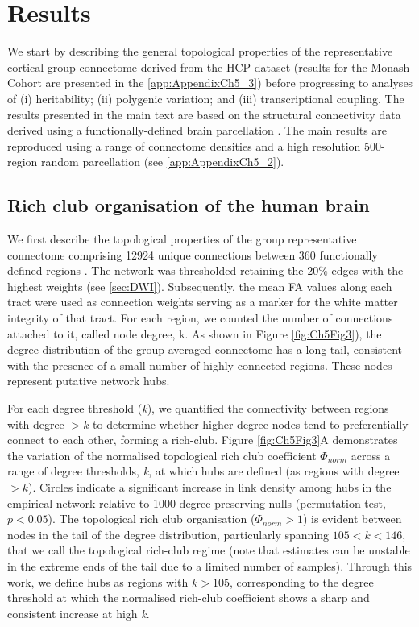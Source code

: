 \section{Results}

We start by describing the general topological properties of the representative cortical group connectome derived from the HCP dataset (results for the Monash Cohort are presented in the \ref{app:AppendixCh5_3}) before progressing to analyses of (i) heritability; (ii) polygenic variation; and (iii) transcriptional coupling. The results presented in the main text are based on the structural connectivity data derived using a functionally-defined brain parcellation \citep{Glasser2016}. The main results are reproduced using a range of connectome densities and a high resolution 500-region random parcellation (see \ref{app:AppendixCh5_2}). 

\subsection{Rich club organisation of the human brain}

We first describe the topological properties of the group representative connectome comprising \num{12924} unique connections between 360 functionally defined regions \citep{Glasser2016}. The network was thresholded retaining the $20\%$ edges with the highest weights (see \ref{sec:DWI}). Subsequently, the mean FA values along each tract were used as connection weights serving as a marker for the white matter integrity of that tract. For each region, we counted the number of connections attached to it, called node degree, k. As shown in Figure \ref{fig:Ch5Fig3}), the degree distribution of the group-averaged connectome has a long-tail, consistent with the presence of a small number of highly connected regions. These nodes represent putative network hubs. 

For each degree threshold (\textit{k}), we quantified the connectivity between regions with degree $> k$ to determine whether higher degree nodes tend to preferentially connect to each other, forming a rich-club. Figure \ref{fig:Ch5Fig3}A demonstrates the variation of the normalised topological rich club coefficient $\Phi_{norm}$ across a range of degree thresholds, \textit{k}, at which hubs are defined (as regions with degree $> k$). Circles indicate a significant increase in link density among hubs in the empirical network relative to 1000 degree-preserving nulls (permutation test, $p < 0.05$). The topological rich club organisation ($\Phi_{norm} >1$) is evident between nodes in the tail of the degree distribution, particularly spanning $105< k <146$, that we call the topological rich-club regime (note that estimates can be unstable in the extreme ends of the tail due to a limited number of samples). Through this work, we define hubs as regions with $k > 105$, corresponding to the degree threshold at which the normalised rich-club coefficient shows a sharp and consistent increase at high \textit{k}. 

